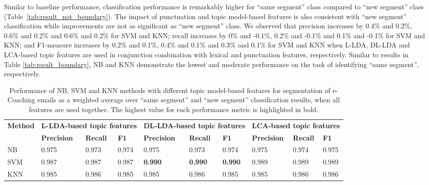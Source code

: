 \documentclass{amia}
\begin{document}
Similar to baseline performance, classification performance is remarkably higher for ``same segment'' class compared to ``new segment'' class (Table~\ref{tab:result_not_boundary}). The impact of punctuation and topic model-based features is also consistent with ``new segment'' classification while improvements are not as significant as ``new segment'' class. We observed that precision increases by 0.4\% and 0.2\%, 0.6\% and 0.2\% and 0.6\% and 0.2\% for SVM and KNN; recall increases by 0\% and -0.1\%, 0.2\% and -0.1\% and 0.1\% and -0.1\% for SVM and KNN; and F1-measure increases by 0.2\% and 0.1\%, 0.4\% and 0.1\% and 0.3\% and 0.1\% for SVM and KNN when L-LDA, DL-LDA and LCA-based topic features are used in conjunction combination with lexical and punctuation features, respectively. Similar to results in Table \ref{tab:result_boundary}, NB and KNN demonstrate the lowest and moderate performance on the task of identifying ``same segment'', respectively. \\   

\begin{table}[ht]
\centering
\caption{Performance of NB, SVM and KNN methods with different topic model-based features for segmentation of e-Coaching emails as a weighted average over ``same segment'' and ``new segment'' classification results, when all features are used together. The highest value for each performance metric is highlighted in bold.}
\label{tab:result_weighted_avg}
  \begin{tabular}{|l|l|l|l|l|l|l|l|l|l|}
  \hline
   \multirow{2}{*}{\textbf{Method}} & \multicolumn{3}{|c|}{\textbf{L-LDA-based topic features}} & \multicolumn{3}{|c|}{\textbf{DL-LDA-based topic features}}  & \multicolumn{3}{|c|}{\textbf{LCA-based topic features}} \\\cline{2-10} & \textbf{Precision}  & \textbf{Recall} & \textbf{F1} & \textbf{Precision}  & \textbf{Recall} & \textbf{F1} & \textbf{Precision}  & \textbf{Recall} & \textbf{F1}\\ \hline  
    
 NB & 0.975 & 0.973 & 0.974 & 0.975 & 0.973 & 0.974 & 0.975 & 0.974 & 0.975 \\ \hline
 SVM & 0.987 & 0.987 & 0.987 & \textbf{0.990} & \textbf{0.990} & \textbf{0.990} & 0.989 & 0.989 & 0.989 \\ \hline
 KNN & 0.985 & 0.986 & 0.985 & 0.985 & 0.986 & 0.985 & 0.985 & 0.986 & 0.986 \\ \hline
  \end{tabular}
\end{table}         
\end{document}
